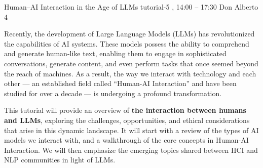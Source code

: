 %

\clearpage
\begin{tutorial}
  {Human--AI Interaction in the Age of LLMs}
  {tutorial-5}
  {\daydateyear, 14:00 -- 17:30}
  {Don Alberto 4}

Recently, the development of Large Language Models (LLMs) has revolutionized the capabilities of AI systems. These models possess the ability to comprehend and generate human-like text, enabling them to engage in sophisticated conversations, generate content, and even perform tasks that once seemed beyond the reach of machines. As a result, the way we interact with technology and each other --- an established field called ``Human-AI Interaction'' and have been studied for over a decade --- is undergoing a profound transformation.

This tutorial will provide an overview of \textbf{the interaction between humans and LLMs}, exploring the challenges, opportunities, and ethical considerations that arise in this dynamic landscape. It will start with a review of the types of AI models we interact with, and a walkthrough of the core concepts in Human-AI Interaction. We will then emphasize the emerging topics shared between HCI and NLP communities in light of LLMs.

\end{tutorial}
